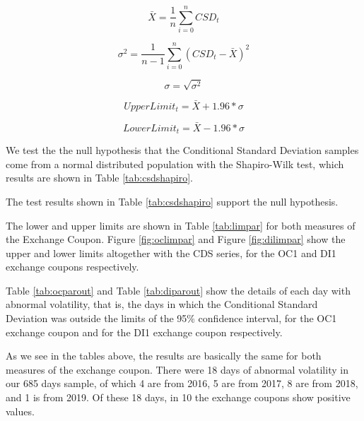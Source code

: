 \documentclass[cic,tc, english]{iiufrgs}
\begin{document}
    $$\bar{X} = \frac{1}{n} \displaystyle\sum_{i=0}^{n} CSD_t$$

    $$\sigma^2 = \frac{1}{n-1} \displaystyle\sum_{i=0}^{n} (CSD_t - \bar{X})^2$$

    $$\sigma = \sqrt{\sigma^2}$$

    \begin{equation}
        \label{eqn:upp}
        UpperLimit_t = \bar{X} + 1.96 * \sigma
    \end{equation}

    \begin{equation}
        \label{eqn:lop}
        LowerLimit_t = \bar{X} - 1.96 * \sigma
    \end{equation}

    We test the the null hypothesis that the Conditional Standard Deviation samples come from a normal distributed population with the Shapiro-Wilk test, which results are shown in Table \ref{tab:csdshapiro}.

    

    The test results shown in Table \ref{tab:csdshapiro} support the null hypothesis.

    The lower and upper limits are shown in Table \ref{tab:limpar} for both measures of the Exchange Coupon. Figure \ref{fig:oclimpar} and Figure \ref{fig:dilimpar} show the upper and lower limits altogether with the CDS series, for the OC1 and DI1 exchange coupons respectively.

    

    

    

    Table \ref{tab:ocparout} and Table \ref{tab:diparout} show the details of each day with abnormal volatility, that is, the days in which the Conditional Standard Deviation was outside the limits of the 95\% confidence interval, for the OC1 exchange coupon and for the DI1 exchange coupon respectively.

    

    

    As we see in the tables above, the results are basically the same for both measures of the exchange coupon. There were 18 days of abnormal volatility in our 685 days sample, of which 4 are from 2016, 5 are from 2017, 8 are from 2018, and 1 is from 2019. Of these 18 days, in 10 the exchange coupons show positive values.
\end{document}
